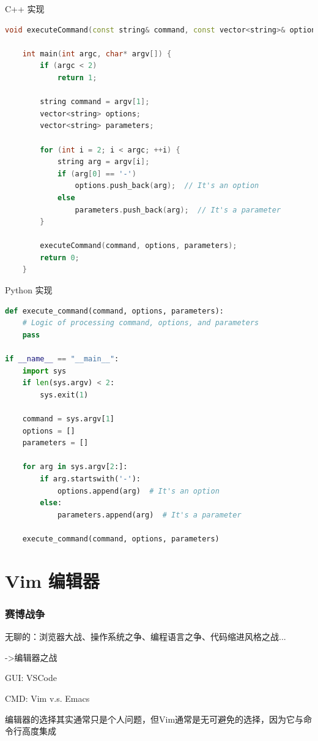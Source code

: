 \documentclass[UTF8, 16pt]{beamer}
\begin{document}
\begin{frame}[fragile]
    \textcolor{sufered}{C++ 实现}
    \begin{lstlisting}[language=c++,basicstyle=\ttfamily\scriptsize]
    void executeCommand(const string& command, const vector<string>& options, const vector<string>& parameters);
    
    int main(int argc, char* argv[]) {
        if (argc < 2)
            return 1;
        
        string command = argv[1];
        vector<string> options;
        vector<string> parameters;
        
        for (int i = 2; i < argc; ++i) {
            string arg = argv[i];
            if (arg[0] == '-')
                options.push_back(arg);  // It's an option
            else
                parameters.push_back(arg);  // It's a parameter
        }
        
        executeCommand(command, options, parameters); 
        return 0;
    }\end{lstlisting}
\end{frame}

\begin{frame}[fragile]
    \textcolor{sufered}{Python 实现}
    \begin{lstlisting}[language=python,basicstyle=\ttfamily\scriptsize]
def execute_command(command, options, parameters):
    # Logic of processing command, options, and parameters
    pass

if __name__ == "__main__":
    import sys
    if len(sys.argv) < 2:
        sys.exit(1)
    
    command = sys.argv[1]
    options = []
    parameters = []
    
    for arg in sys.argv[2:]:
        if arg.startswith('-'):
            options.append(arg)  # It's an option
        else:
            parameters.append(arg)  # It's a parameter
    
    execute_command(command, options, parameters)
\end{lstlisting}
\end{frame}

\section{Vim 编辑器}
\begin{frame}
    \frametitle{赛博战争}
    \textcolor{sufered}{无聊的：浏览器大战、操作系统之争、编程语言之争、代码缩进风格之战...}

    \textcolor{sufered}{->编辑器之战}

    GUI: VSCode

    CMD: Vim v.s. Emacs

    编辑器的选择其实通常只是个人问题，但Vim通常是无可避免的选择，因为它与命令行高度集成
\end{frame}
\end{document}
